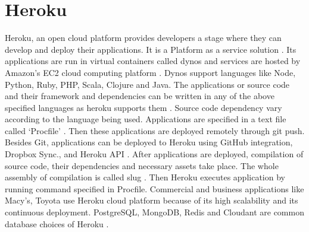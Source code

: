 \section{Heroku}
 
 Heroku, an open cloud platform provides developers a stage where they can develop
 and deploy their applications. It is a Platform as a service solution \cite{www-heroku}.
 Its applications are run in virtual containers called dynos and services are hosted by
 Amazon’s EC2 cloud computing platform  \cite{wikipedia-org}. Dynos support languages like
 Node, Python, Ruby, PHP, Scala, Clojure and Java. The applications or source code and
 their framework and dependencies can be written in any of the above specified languages
 as heroku supports them \cite{how-heroku-works}. Source code dependency vary according
 to the language being used. Applications are specified in a text file called
 ‘Procfile’ \cite{how-heroku-works}. Then these applications  are deployed remotely
 through git push. Besides Git, applications can be deployed to Heroku using GitHub
 integration, Dropbox Sync., and Heroku API \cite{how-heroku-works}. After applications
 are deployed, compilation of source code, their dependencies and necessary assets take
 place. The whole assembly of compilation is called slug \cite{how-heroku-works}.
 Then Heroku executes application by running command specified in Procfile.
 Commercial and business applications like Macy’s, Toyota use Heroku cloud platform
 because of its high scalability and its continuous deployment. PostgreSQL, MongoDB,
 Redis and Cloudant are common database choices of Heroku \cite{www-heroku}.
